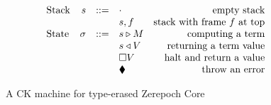 \documentclass[../zerepoch-core-specification.tex]{subfiles}
\begin{document}
\begin{figure}[H]
\begin{subfigure}[c]{\linewidth}
    \centering
    \[\begin{array}{lrclr}
        \textrm{Stack} & s      & ::= & \cdot          & \textrm{empty stack}\\
                       &        &     & s,f            & \textrm{stack with frame $f$ at top}\\
        \textrm{State} & \sigma & ::= & s \triangleright M   & \textrm{computing a term}\\
                       &        &     & s \triangleleft V    & \textrm{returning a term value}\\
                       &        &     & \square V      & \textrm{halt and return a value}\\
                       &        &     & \blacklozenge{}     & \textrm{throw an error}
    \end{array}\]

    \label{fig:untyped-ck-frames}
\end{subfigure}
\caption{A CK machine for type-erased Zerepoch Core}
\end{figure}
\end{document}
